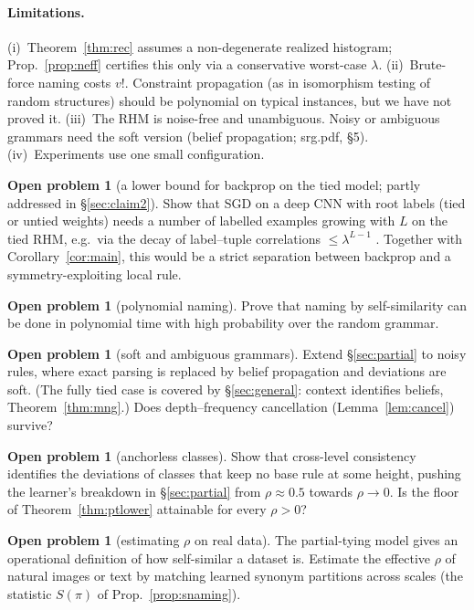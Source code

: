 \documentclass[11pt]{article}
\theoremstyle{definition}
\newtheorem{problem}[theorem]{Open problem}
\begin{document}
\paragraph{Limitations.}
(i)~Theorem~\ref{thm:rec} assumes a non-degenerate realized histogram; Prop.~\ref{prop:neff}
certifies this only via a conservative worst-case $\lambda$. (ii)~Brute-force naming costs
$v!$. Constraint propagation (as in isomorphism testing of random structures) should be
polynomial on typical instances, but we have not proved it. (iii)~The RHM is noise-free and
unambiguous. Noisy or ambiguous grammars need the soft version (belief propagation;
srg.pdf, \S5). (iv)~Experiments use one small configuration.

\begin{problem}[a lower bound for backprop on the tied model; partly addressed in \S\ref{sec:claim2}]
Show that SGD on a deep CNN with root labels (tied or untied weights) needs a number of labelled
examples growing with $L$ on the tied RHM, e.g.\ via the decay of label--tuple correlations
$\le\lambda^{L-1}$ \cite{cagnetta2024}. Together with Corollary~\ref{cor:main}, this would be a
strict separation between backprop and a symmetry-exploiting local rule.
\end{problem}
\begin{problem}[polynomial naming]
Prove that naming by self-similarity can be done in polynomial time with high probability over
the random grammar.
\end{problem}
\begin{problem}[soft and ambiguous grammars]
Extend \S\ref{sec:partial} to noisy rules, where exact parsing is replaced by belief propagation
and deviations are soft. (The fully tied case is covered by \S\ref{sec:general}: context identifies beliefs, Theorem~\ref{thm:mng}.) Does depth--frequency cancellation (Lemma~\ref{lem:cancel}) survive?
\end{problem}
\begin{problem}[anchorless classes]
Show that cross-level consistency identifies the deviations of classes that keep no base rule at
some height, pushing the learner's breakdown in \S\ref{sec:partial} from $\rho\approx0.5$
towards $\rho\to0$. Is the floor of Theorem~\ref{thm:ptlower} attainable for every $\rho>0$?
\end{problem}
\begin{problem}[estimating $\rho$ on real data]
The partial-tying model gives an operational definition of how self-similar a dataset is. Estimate
the effective $\rho$ of natural images or text by matching learned synonym partitions across
scales (the statistic $S(\pi)$ of Prop.~\ref{prop:snaming}).
\end{problem}
\end{document}
